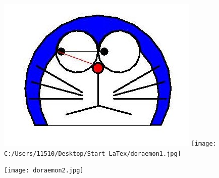 \documentclass{article}
\begin{document}
\includegraphics{doraemon1.jpg}
\texttt{[image: C:/Users/11510/Desktop/Start\_LaTex/doraemon1.jpg]} %
%
\graphicspath{{C:/Users/11510/Desktop/Start_LaTex/Reserved file for pictures}}
\texttt{[image: doraemon2.jpg]}
\end{document}
